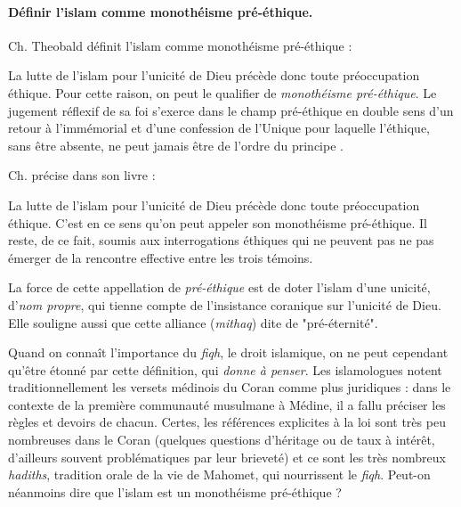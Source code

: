 \paragraph{Définir l'islam comme monothéisme pré-éthique.}  Ch. Theobald définit  l'islam comme monothéisme pré-éthique :
\begin{singlequote}
    La lutte de l'islam pour l'unicité de Dieu précède donc toute préoccupation éthique. Pour cette raison, on peut le qualifier de \textit{monothéisme pré-éthique}. Le jugement réflexif de sa foi s'exerce dans le champ pré-éthique en double sens d'un retour à l'immémorial et d'une confession de l'Unique pour laquelle l'éthique, sans être absente, ne peut jamais être de l'ordre du principe \cite{centre_sevres_paris_unique_1996}.
\end{singlequote}
Ch. précise dans son livre : 
\begin{singlequote}
    La lutte de l'islam pour l'unicité de Dieu précède donc toute préoccupation éthique. C'est en ce sens qu'on peut appeler son monothéisme pré-éthique. Il reste, de ce fait, soumis aux interrogations éthiques qui ne peuvent pas ne pas émerger de la rencontre effective entre les trois témoins. \cite[p. 786] {theobald_christianisme_2007}
\end{singlequote}

La force de cette appellation de \textit{pré-éthique} est de doter l'islam d'une unicité, d'\textit{nom propre}, qui tienne compte de l'insistance coranique sur l'unicité de Dieu. Elle souligne aussi que cette alliance (\emph{mithaq}) dite de "pré-éternité".

Quand on connaît l'importance du \textit{fiqh}, le droit islamique, on ne peut cependant qu'être étonné par cette définition, qui \textit{donne à penser}. Les islamologues notent traditionnellement les versets médinois du Coran comme plus juridiques : dans le contexte de la première communauté musulmane à Médine, il a fallu préciser les règles et devoirs de chacun. Certes, les références explicites à la loi sont très peu nombreuses dans le Coran (quelques questions d'héritage ou de taux à intérêt, d'ailleurs souvent problématiques par leur brieveté) et ce sont les très nombreux \textit{hadiths}, tradition orale de la vie de Mahomet, qui nourrissent le \textit{fiqh}. Peut-on néanmoins dire que l'islam est un monothéisme pré-éthique ? 


